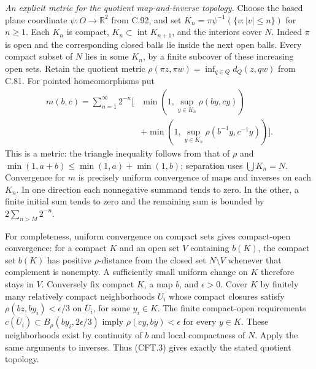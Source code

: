 \documentclass[11pt,a4paper]{article}
\begin{document}
\emph{An explicit metric for the quotient map-and-inverse topology.}
Choose the based plane coordinate $\psi:O\to\mathbb R^2$ from
C.92, and set
$K_n=\pi\psi^{-1}(\{v:|v|\leq n\})$ for $n\geq1$.
Each $K_n$ is compact,
$K_n\subset\operatorname{int}K_{n+1}$, and the interiors cover $N$.
Indeed $\pi$ is open and the corresponding closed balls lie
inside the next open balls. Every compact subset of $N$ lies
in some $K_n$, by a finite subcover of these increasing open
sets. Retain the quotient metric
$\rho(\pi z,\pi w)=\inf_{q\in Q}d_Q(z,qw)$ from C.81.
For pointed homeomorphisms put
\[
\begin{split}
 m(b,c)=\sum_{n=1}^{\infty}2^{-n}\bigg[
 &\min\!\left(1,\sup_{y\in K_n}\rho(by,cy)\right)\\
 &+\min\!\left(1,\sup_{y\in K_n}\rho(b^{-1}y,c^{-1}y)\right)
 \bigg].
\end{split}                                                    \tag{CFT.3}
\]
This is a metric: the triangle inequality follows from that of
$\rho$ and $\min(1,a+b)\leq\min(1,a)+\min(1,b)$; separation
uses $\bigcup K_n=N$. Convergence for $m$ is precisely uniform
convergence of maps and inverses on each $K_n$. In one direction
each nonnegative summand tends to zero. In the other, a finite
initial sum tends to zero and the remaining sum is bounded by
$2\sum_{n>M}2^{-n}$.

For completeness, uniform convergence on compact sets gives
compact-open convergence: for a compact $K$ and an open set
$V$ containing $b(K)$, the compact set $b(K)$ has positive
$\rho$-distance from the closed set $N\setminus V$ whenever
that complement is nonempty. A sufficiently small uniform
change on $K$ therefore stays in $V$.
Conversely fix compact $K$, a map $b$, and $\epsilon>0$.
Cover $K$ by finitely many relatively compact neighborhoods
$U_i$ whose compact closures satisfy
$\rho(bz,by_i)<\epsilon/3$ on $\overline U_i$, for some
$y_i\in K$. The finite compact-open requirements
$c(\overline U_i)\subset B_\rho(by_i,2\epsilon/3)$ imply
$\rho(cy,by)<\epsilon$ for every $y\in K$.
These neighborhoods exist by continuity of $b$ and local
compactness of $N$. Apply the same arguments to inverses.
Thus (CFT.3) gives exactly the stated quotient topology.
\end{document}

